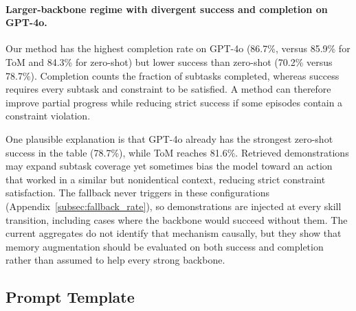 \documentclass{article}
\theoremstyle{plain}
\theoremstyle{definition}
\theoremstyle{remark}
\begin{document}
\paragraph{Larger-backbone regime with divergent success and completion on GPT-4o.} Our method has the highest completion rate on GPT-4o (86.7\%, versus 85.9\% for ToM and 84.3\% for zero-shot) but lower success than zero-shot (70.2\% versus 78.7\%). Completion counts the fraction of subtasks completed, whereas success requires every subtask and constraint to be satisfied. A method can therefore improve partial progress while reducing strict success if some episodes contain a constraint violation.

One plausible explanation is that GPT-4o already has the strongest zero-shot success in the table (78.7\%), while ToM reaches 81.6\%. Retrieved demonstrations may expand subtask coverage yet sometimes bias the model toward an action that worked in a similar but nonidentical context, reducing strict constraint satisfaction. The fallback never triggers in these configurations (Appendix~\ref{subsec:fallback_rate}), so demonstrations are injected at every skill transition, including cases where the backbone would succeed without them. The current aggregates do not identify that mechanism causally, but they show that memory augmentation should be evaluated on both success and completion rather than assumed to help every strong backbone.


\subsection{Prompt Template}
\label{sec:prompts}
\end{document}

